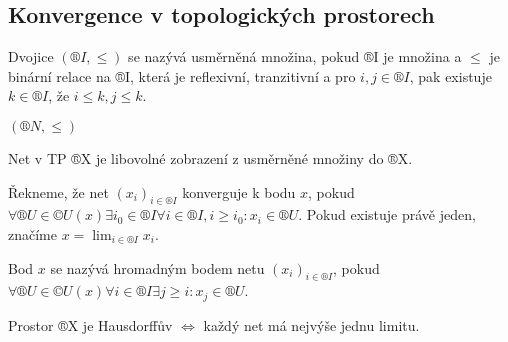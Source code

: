 \documentclass[12pt]{article}					%
\begin{document}
    \subsection{Konvergence v topologických prostorech}
        \begin{definice}
            Dvojice $(®I, ≤)$ se nazývá usměrněná množina, pokud ®I je množina a $≤$ je binární relace na ®I, která je reflexivní, tranzitivní a pro $i, j \in ®I$, pak existuje $k\in ®I$, že $i≤k, j≤k$.

            \begin{prikladyin}
                $(®N, ≤)$
            \end{prikladyin}
        \end{definice}

        \begin{definice}[Net]
            Net v TP ®X je libovolné zobrazení z usměrněné množiny do ®X.
        \end{definice}

        \begin{definice}
            Řekneme, že net $(x_i)_{i \in ®I}$ konverguje k bodu $x$, pokud $\forall ®U \in ©U(x) \exists i_0 \in ®I \forall i \in ®I, i≥ i_0: x_i \in ®U$. Pokud existuje právě jeden, značíme $x= \lim_{i\in®I}x_i$.

            Bod $x$ se nazývá hromadným bodem netu $(x_i)_{i \in ®I}$, pokud $\forall ®U \in ©U(x) \forall i \in ®I \exists j≥i: x_j \in ®U$.
        \end{definice}

        \begin{tvrzeni}
            Prostor ®X je Hausdorffův $\Leftrightarrow$ každý net má nejvýše jednu limitu.
        \end{tvrzeni}
\end{document}
